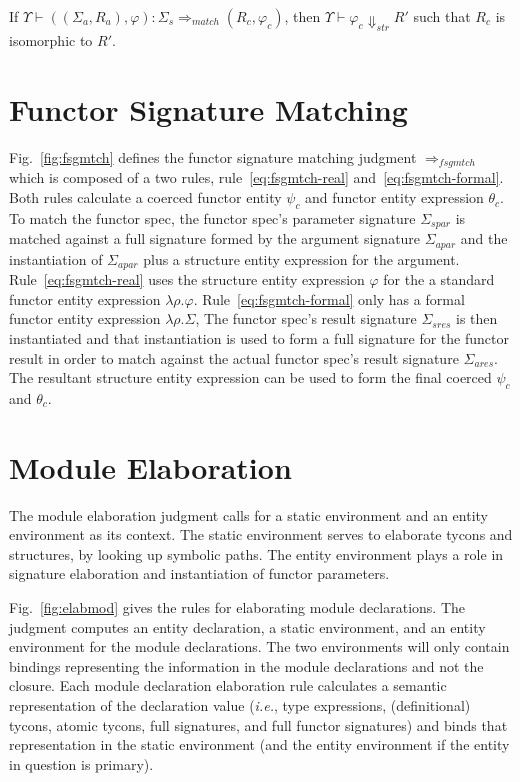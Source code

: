 \documentclass[9pt,nocopyrightspace, fleqn]{sigplanconf}
\begin{document}
\begin{lemma}
If $\Upsilon \vdash ((\Sigma_a,R_a),\varphi) : \Sigma_s
\Rightarrow_{match} (R_c,\varphi_c)$, then $\Upsilon\vdash \varphi_c
\Downarrow_{str} R'$ such that $R_c$ is isomorphic to $R'$. 
\end{lemma}

\section{Functor Signature Matching}
Fig.~\ref{fig:fsgmtch} defines the functor signature matching judgment
$\Rightarrow_{fsgmtch}$ which is composed of a two rules,
rule~\ref{eq:fsgmtch-real} and~\ref{eq:fsgmtch-formal}. Both rules calculate a coerced functor entity
$\psi_c$ and functor entity expression $\theta_c$. To match the
functor spec, the functor spec's parameter signature $\Sigma_{spar}$
is matched against a full signature formed by the argument 
signature $\Sigma_{apar}$ and the instantiation of $\Sigma_{apar}$
plus a structure entity expression for the
argument. Rule~\ref{eq:fsgmtch-real} uses the structure entity
expression $\varphi$ for the a standard functor entity expression
$\lambda\rho.\varphi$. Rule~\ref{eq:fsgmtch-formal} only has a formal
functor entity expression $\lambda\rho.\Sigma$, 
The functor spec's result signature $\Sigma_{sres}$ is then
instantiated and that instantiation is used to form a full signature
for the functor result in order to match against the actual functor
spec's result signature $\Sigma_{ares}$. The resultant structure
entity expression can be used to form the final coerced $\psi_c$ and
$\theta_c$.  

\section{Module Elaboration}\label{sec:modelab}

The module elaboration judgment calls for a static environment and an entity environment as its context. The static environment serves to elaborate tycons and structures, by looking up symbolic paths. The entity environment plays a role in signature elaboration and instantiation of functor parameters. 

Fig.~\ref{fig:elabmod} gives the rules for elaborating module declarations. The judgment computes an entity declaration, a static environment, and an entity environment for the module declarations. The two environments will only contain bindings representing the information in the module declarations and not the closure. Each module declaration elaboration rule calculates a semantic representation of the declaration value (\emph{i.e.}, type expressions, (definitional) tycons, atomic tycons, full signatures, and full functor signatures) and binds that representation in the static environment (and the entity environment if the entity in question is primary). 
\end{document}
